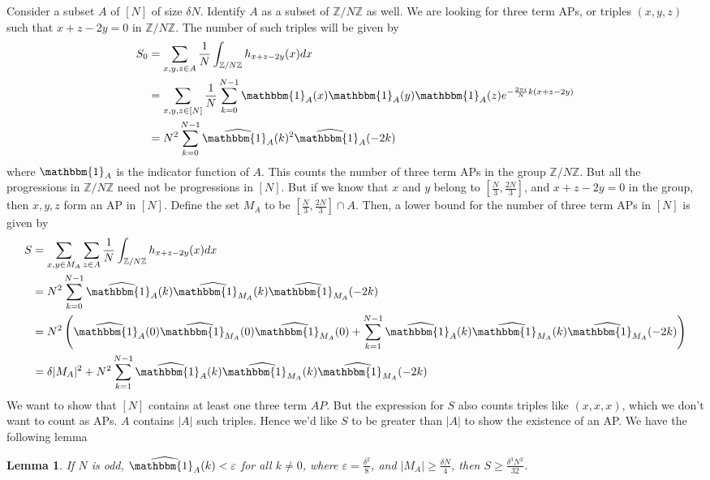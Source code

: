 \documentclass[12pt]{article}
\newtheorem{lem}[thm]{Lemma}
\theoremstyle{definition}
\newcommand{\vep}{\varepsilon}
\newcommand{\znz}{\mathbb{Z}/N\mathbb{Z}}
\newcommand{\indi}{\mathbbm{1}}
\begin{document}
Consider a subset $A$ of $[N]$ of size $\delta N$. Identify $A$ as a subset of $\znz$ as well. We are looking for three term APs, or triples $(x,y,z)$ such that $x+z - 2y = 0$ in $\znz$. The number of such triples will be given by
\begin{align*}
    S_0 &= \sum_{x,y,z \in A} \frac{1}{N} \int_{\znz} h_{x+z-2y}(x) dx \\
    &= \sum_{x,y,z \in [N]} \frac{1}{N} \sum_{k=0}^{N-1} \indi_{A}(x) \indi_{A}(y) \indi_{A}(z) e^{-\frac{2\pi i}{N} k (x+z-2y)} \\
    &= N^2 \sum_{k=0}^{N-1} \widehat{\indi_A}(k)^2 \widehat{\indi_A}(-2k)
\end{align*}
where $\indi_A$ is the indicator function of $A$. This counts the number of three term APs in the group $\znz$. But all the progressions in $\znz$ need not be progressions in $[N]$. But if we know that $x$ and $y$ belong to $\left[ \frac{N}{3}, \frac{2N}{3} \right]$, and $x+z-2y=0$ in the group, then $x,y,z$ form an AP in $[N]$. Define the set $M_A$ to be $\left[ \frac{N}{3}, \frac{2N}{3} \right] \cap A$. Then, a lower bound for the number of three term APs in $[N]$ is given by
\begin{align*}
    S &= \sum_{x,y \in M_A} \sum_{z \in A}  \frac{1}{N} \int_{\znz} h_{x+z-2y}(x) dx \\
    &= N^2 \sum_{k=0}^{N-1} \widehat{\indi_A}(k) \widehat{\indi_{M_A}}(k) \widehat{\indi_{M_A}}(-2k) \\
    &= N^2 \left(\widehat{\indi_A}(0) \widehat{\indi_{M_A}}(0) \widehat{\indi_{M_A}}(0) + \sum_{k=1}^{N-1} \widehat{\indi_A}(k) \widehat{\indi_{M_A}}(k) \widehat{\indi_{M_A}}(-2k) \right) \\
    &= \delta |M_A|^2 + N^2 \sum_{k=1}^{N-1} \widehat{\indi_A}(k) \widehat{\indi_{M_A}}(k) \widehat{\indi_{M_A}}(-2k)
\end{align*}
We want to show that $[N]$ contains at least one three term $AP$. But the expression for $S$ also counts triples like $(x,x,x)$, which we don't want to count as APs. $A$ contains $|A|$ such triples. Hence we'd like $S$ to be greater than $|A|$ to show the existence of an AP. We have the following lemma
\begin{lem}\label{lem:3}
    If $N$ is odd, $\widehat{\indi_A}(k) < \vep$ for all $k \neq 0$, where $\vep = \frac{\delta^2}{8}$, and $|M_A| \geq \frac{\delta N}{4}$, then $S \geq \frac{\delta^3 N^2}{32}$.
\end{lem}
\end{document}
